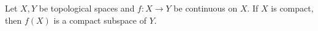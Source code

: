 Let $X, Y$ be topological spaces and $f: X \to Y$ be continuous on $X$. If $X$ is compact, then $f(X)$ is a compact subspace of $Y$.